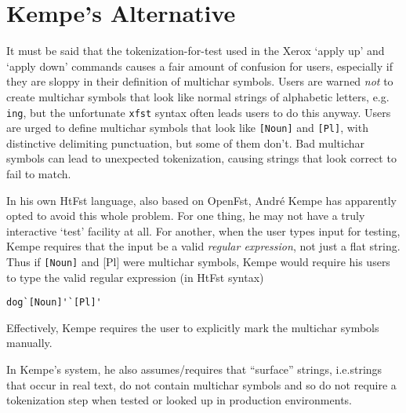 \documentclass[letterpaper,12pt]{article}
\begin{document}
\appendix

\section{Kempe's Alternative}

It must be said that the tokenization-for-test used in the Xerox `apply up'
and `apply down' commands causes a fair amount of confusion for users,
especially if they are sloppy in their definition of multichar symbols.
Users are warned \emph{not} to create multichar symbols that look like normal
strings of alphabetic letters, e.g. \texttt{ing}, but the unfortunate
\texttt{xfst} syntax often leads users to do this anyway.  Users are
urged to define multichar symbols that look like \texttt{[Noun]} and
\texttt{[Pl]}, with distinctive delimiting punctuation, but some of them
don't.  Bad multichar symbols can lead to unexpected tokenization,
causing strings that look correct to fail to match.

In his own HtFst language, also based on OpenFst, Andr\'e Kempe has
apparently opted to avoid this whole problem.  For one thing, he may not
have a truly interactive `test' facility at all.  For another, when the user
types input for testing, Kempe requires that the input be a valid \emph{regular
expression}, not just a flat string.  Thus if \texttt{[Noun]} and {[Pl]}
were multichar symbols, Kempe would require his users to type the valid
regular expression (in HtFst syntax)

\begin{Verbatim}[fontsize=\small]
dog`[Noun]'`[Pl]'
\end{Verbatim}

\noindent
Effectively, Kempe requires the user to explicitly mark the multichar
symbols manually.

In Kempe's system, he also assumes/requires that ``surface'' strings,
i.e.\@ strings that occur in real text, do not contain multichar symbols
and so do not require a tokenization step when tested or looked up in
production environments.
\end{document}
